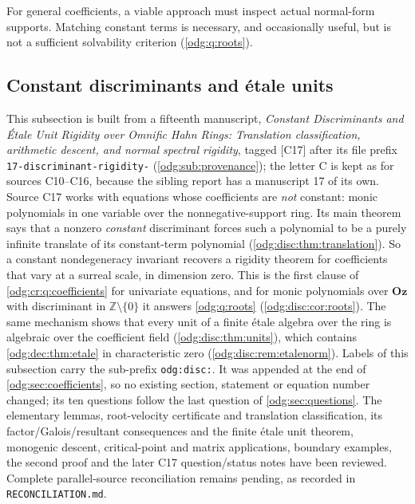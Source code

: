 \documentclass[11pt,oneside]{article}
\numberwithin{equation}{section}
\theoremstyle{definition}
\theoremstyle{remark}
\newcommand{\Oz}{\mathbf{Oz}}
\newcommand{\Z}{\mathbb Z}
\newcommand{\src}[1]{\textup{\textsf{\small[#1]}}}
\newcommand{\fn}[1]{\nolinkurl{#1}}
\begin{document}
For general coefficients, a viable approach must inspect actual normal-form
supports. Matching constant terms is necessary, and occasionally useful, but
is not a sufficient solvability criterion (\cref{odg:q:roots}).

\subsection{Constant discriminants and \texorpdfstring{\'etale}{etale} units}\label{odg:disc:sub:disc}

This subsection is built from a fifteenth manuscript, \emph{Constant Discriminants and
\'Etale Unit Rigidity over Omnific Hahn Rings: Translation classification, arithmetic
descent, and normal spectral rigidity}, tagged \src{C17} after its file prefix
\fn{17-discriminant-rigidity-} (\cref{odg:sub:provenance}); the letter C is kept as for
sources C10--C16, because the sibling report has a manuscript 17 of its own. Source C17
works with equations whose coefficients are \emph{not} constant: monic polynomials in one
variable over the nonnegative-support ring. Its main theorem says that a nonzero
\emph{constant} discriminant forces such a polynomial to be a purely infinite translate of
its constant-term polynomial (\cref{odg:disc:thm:translation}). So a constant
nondegeneracy invariant recovers a rigidity theorem for coefficients that vary at a
surreal scale, in dimension zero. This is the first clause of
\cref{odg:cr:q:coefficients} for univariate equations, and for monic polynomials over $\Oz$
with discriminant in $\Z\setminus\{0\}$ it answers \cref{odg:q:roots}
(\cref{odg:disc:cor:roots}). The same mechanism shows that every unit of a finite
\'etale algebra over the ring is algebraic over the coefficient field
(\cref{odg:disc:thm:units}), which contains \cref{odg:dec:thm:etale} in characteristic
zero (\cref{odg:disc:rem:etalenorm}). Labels of this subsection carry the sub-prefix
\fn{odg:disc:}. It was appended at the end of \cref{odg:sec:coefficients}, so no existing
section, statement or equation number changed; its ten questions follow the last question
of \cref{odg:sec:questions}. The elementary lemmas, root-velocity certificate and
translation classification, its factor/Galois/resultant consequences and the finite
\'etale unit theorem, monogenic descent, critical-point and matrix applications,
boundary examples, the second proof and the later C17 question/status
notes have been reviewed. Complete parallel-source reconciliation remains pending, as recorded in
\fn{RECONCILIATION.md}.
\end{document}
